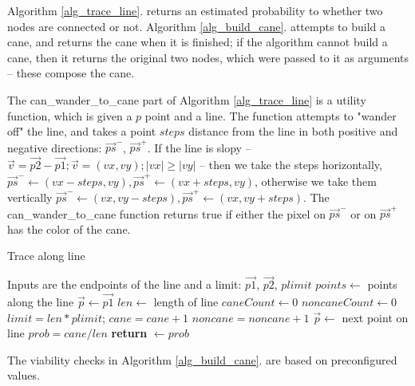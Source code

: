 \documentclass{PSAIE}%
\begin{document}
Algorithm \ref{alg_trace_line}. returns an estimated probability to whether two nodes are connected or not.
Algorithm \ref{alg_build_cane}. attempts to build a cane, and returns the cane when it is finished; if the
algorithm cannot build a cane, then it returns the original two nodes, which were passed to it as arguments
-- these compose the cane.

The can\_wander\_to\_cane part of Algorithm \ref{alg_trace_line} is a utility function, which is given
a $p$ point and a line. The function attempts to "wander off" the line, and takes a point $steps$ distance from the
line in both positive and negative directions: $\vec{ps}^-$, $\vec{ps}^+$. If the line is slopy --
$\vec{v} = \vec{p2} - \vec{p1}; \vec{v} = (vx, vy); |vx| \geq |vy|$ -- then we take the steps horizontally,
$\vec{ps}^- \gets (vx - steps, vy), \vec{ps}^+ \gets (vx + steps, vy)$, otherwise we take them vertically
$\vec{ps}^- \gets (vx, vy - steps), \vec{ps}^+ \gets (vx, vy + steps)$. The can\_wander\_to\_cane function
returns true if either the pixel on $\vec{ps}^-$ or on $\vec{ps}^+$ has the color of the cane.

\begin{algorithm}
      \caption{Trace along line}
      \label{alg_trace_line}
      \begin{algorithmic}
            \Comment Inputs are the endpoints of the line and a limit: $\vec{p1}$, $\vec{p2}$, $plimit$
            \State $points \gets$ points along the line
            \State $\vec{p}\gets \vec{p1}$
            \State $len \gets$ length of line
            \State $caneCount \gets 0$
            \State $noncaneCount \gets 0$
            \State $limit = len * plimit$; 
            \State $cane = cane + 1$
            \Else
            \State $noncane = noncane + 1$
            \EndIf
            \State $\vec{p} \gets$ next point on line
            \EndWhile
            \State $prob = cane / len$
            \State \textbf{return} $\gets prob$
            \EndFunction
      \end{algorithmic}
\end{algorithm}

The viability checks in Algorithm \ref{alg_build_cane}. are based on preconfigured values.
\end{document}
